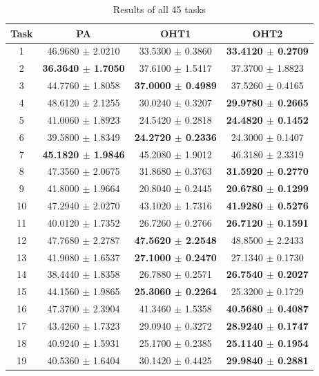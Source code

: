 \documentclass[twocolumn]{article}
\begin{document}
\begin{table}[!htb]
\tiny
\caption{Results of all 45 tasks}
\begin{tabular}{|c||c|c|c|}
\hline\hline
Task &	PA                            & OHT1                          & OHT2 \\
\hline\hline
%
1 & 46.9680 $\pm$ 2.0210 & 33.5300 $\pm$ 0.3860 & \textbf{33.4120 $\pm$ 0.2709}\\
2 & \textbf{36.3640 $\pm$ 1.7050} & 37.6100 $\pm$ 1.5417 & 37.3700 $\pm$ 1.8823\\
3 & 44.7760 $\pm$ 1.8058 & \textbf{37.0000 $\pm$ 0.4989} & 37.5260 $\pm$ 0.4165\\
4 & 48.6120 $\pm$ 2.1255 & 30.0240 $\pm$ 0.3207 & \textbf{29.9780 $\pm$ 0.2665}\\
5 & 41.0060 $\pm$ 1.8923 & 24.5420 $\pm$ 0.2818 & \textbf{24.4820 $\pm$ 0.1452}\\
6 & 39.5800 $\pm$ 1.8349 & \textbf{24.2720 $\pm$ 0.2336} & 24.3000 $\pm$ 0.1407\\
7 & \textbf{45.1820 $\pm$ 1.9846} & 45.2080 $\pm$ 1.9012 & 46.3180 $\pm$ 2.3319\\
8 & 47.3560 $\pm$ 2.0675 & 31.8680 $\pm$ 0.3763 & \textbf{31.5920 $\pm$ 0.2770}\\
9 & 41.8000 $\pm$ 1.9664 & 20.8040 $\pm$ 0.2445 & \textbf{20.6780 $\pm$ 0.1299}\\
10 & 47.2940 $\pm$ 2.0270 & 43.1020 $\pm$ 1.7316 & \textbf{41.9280 $\pm$ 0.5276}\\
11 & 40.0120 $\pm$ 1.7352 & 26.7260 $\pm$ 0.2766 & \textbf{26.7120 $\pm$ 0.1591}\\
12 & 47.7680 $\pm$ 2.2787 & \textbf{47.5620 $\pm$ 2.2548} & 48.8500 $\pm$ 2.2433\\
13 & 41.9080 $\pm$ 1.6537 & \textbf{27.1000 $\pm$ 0.2470} & 27.1340 $\pm$ 0.1730\\
14 & 38.4440 $\pm$ 1.8358 & 26.7880 $\pm$ 0.2571 & \textbf{26.7540 $\pm$ 0.2027}\\
15 & 44.1560 $\pm$ 1.9865 & \textbf{25.3060 $\pm$ 0.2264} & 25.3200 $\pm$ 0.1729\\
16 & 47.3700 $\pm$ 2.3904 & 41.3460 $\pm$ 1.5358 & \textbf{40.5680 $\pm$ 0.4087}\\
17 & 43.4260 $\pm$ 1.7323 & 29.0940 $\pm$ 0.3272 & \textbf{28.9240 $\pm$ 0.1747}\\
18 & 40.9240 $\pm$ 1.5931 & 25.1700 $\pm$ 0.2385 & \textbf{25.1140 $\pm$ 0.1954}\\
19 & 40.5360 $\pm$ 1.6404 & 30.1420 $\pm$ 0.4425 & \textbf{29.9840 $\pm$ 0.2881}\\

\end{tabular}
\end{table}
\end{document}
